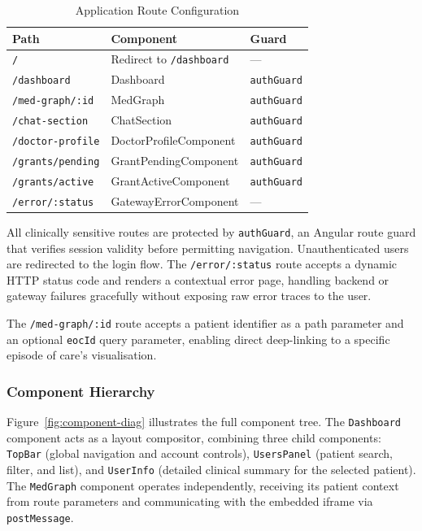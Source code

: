 \begin{table}[H]
    \centering
    \caption{Application Route Configuration}
    \label{tab:routes}
    \begin{tabular}{|l|l|l|}
        \hline
        \textbf{Path}           & \textbf{Component}          & \textbf{Guard}   \\
        \hline
        \texttt{/}              & Redirect to \texttt{/dashboard} & ---             \\
        \texttt{/dashboard}     & Dashboard                   & \texttt{authGuard} \\
        \texttt{/med-graph/:id} & MedGraph                    & \texttt{authGuard} \\
        \texttt{/chat-section}  & ChatSection                 & \texttt{authGuard} \\
        \texttt{/doctor-profile}& DoctorProfileComponent      & \texttt{authGuard} \\
        \texttt{/grants/pending}& GrantPendingComponent       & \texttt{authGuard} \\
        \texttt{/grants/active} & GrantActiveComponent        & \texttt{authGuard} \\
        \texttt{/error/:status} & GatewayErrorComponent       & ---              \\
        \hline
    \end{tabular}
\end{table}

All clinically sensitive routes are protected by \texttt{authGuard}, an
Angular route guard that verifies session validity before permitting
navigation. Unauthenticated users are redirected to the login flow. The
\texttt{/error/:status} route accepts a dynamic HTTP status code and renders a
contextual error page, handling backend or gateway failures gracefully without
exposing raw error traces to the user.

The \texttt{/med-graph/:id} route accepts a patient identifier as a path
parameter and an optional \texttt{eocId} query parameter, enabling direct
deep-linking to a specific episode of care's visualisation.

\subsubsection{Component Hierarchy}

Figure~\ref{fig:component-diag} illustrates the full component tree. The
\texttt{Dashboard} component acts as a layout compositor, combining three
child components: \texttt{TopBar} (global navigation and account controls),
\texttt{UsersPanel} (patient search, filter, and list), and \texttt{UserInfo}
(detailed clinical summary for the selected patient). The \texttt{MedGraph}
component operates independently, receiving its patient context from route
parameters and communicating with the embedded iframe via \texttt{postMessage}.

